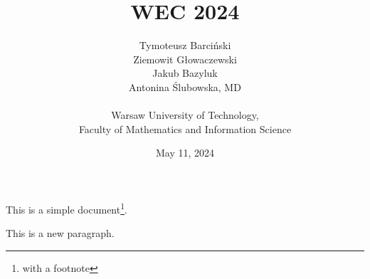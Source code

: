 \documentclass[a4paper,12pt]{article} %
\title{WEC 2024}
\date{May 11, 2024}
\author{
    Tymoteusz Barciński\\
    Ziemowit Głowaczewski\\
    Jakub Bazyluk\\
    Antonina Ślubowska, MD\\
    \\
    Warsaw University of Technology,\\
    Faculty of Mathematics and Information Science
}
\begin{document}

\maketitle

This is   a simple
document\footnote{with a footnote}.

This is a new paragraph.
\end{document}

